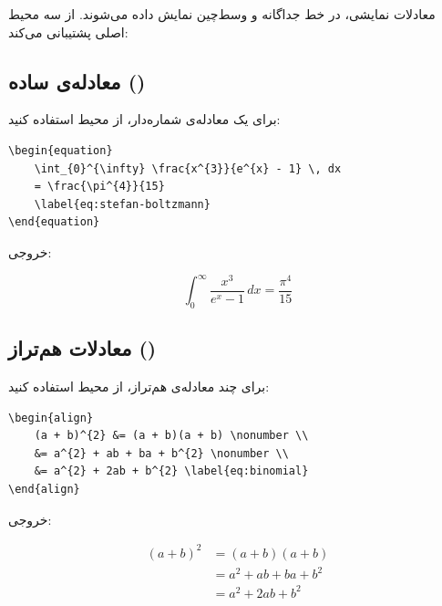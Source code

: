 معادلات نمایشی، در خط جداگانه و وسط‌چین نمایش
داده می‌شوند.  از سه محیط اصلی
پشتیبانی می‌کند:

\subsection{معادله‌ی ساده ()}
\label{sec:math-equation}

برای یک معادله‌ی شماره‌دار، از محیط
 استفاده کنید:

\begin{latin}
\begin{verbatim}
\begin{equation}
    \int_{0}^{\infty} \frac{x^{3}}{e^{x} - 1} \, dx
    = \frac{\pi^{4}}{15}
    \label{eq:stefan-boltzmann}
\end{equation}
\end{verbatim}
\end{latin}

خروجی:

\begin{equation}
    \int_{0}^{\infty} \frac{x^{3}}{e^{x} - 1} \, dx
    = \frac{\pi^{4}}{15}
    \label{eq:stefan-boltzmann-ch9}
\end{equation}


\subsection{معادلات هم‌تراز ()}
\label{sec:math-align}

برای چند معادله‌ی هم‌تراز، از محیط 
استفاده کنید:

\begin{latin}
\begin{verbatim}
\begin{align}
    (a + b)^{2} &= (a + b)(a + b) \nonumber \\
    &= a^{2} + ab + ba + b^{2} \nonumber \\
    &= a^{2} + 2ab + b^{2} \label{eq:binomial}
\end{align}
\end{verbatim}
\end{latin}

خروجی:

\begin{align}
    (a + b)^{2} &= (a + b)(a + b) \nonumber \\
    &= a^{2} + ab + ba + b^{2} \nonumber \\
    &= a^{2} + 2ab + b^{2} \label{eq:binomial-ch9}
\end{align}

